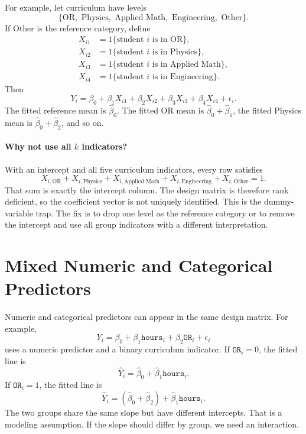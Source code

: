 {For example, let curriculum have levels
\begin{equation}
  \{\text{OR},\text{ Physics},\text{ Applied Math},\text{ Engineering},\text{ Other}\}.
\end{equation}
If Other is the reference category, define
\begin{align}
  X_{i1}&=1\{\text{student }i\text{ is in OR}\},\\
  X_{i2}&=1\{\text{student }i\text{ is in Physics}\},\\
  X_{i3}&=1\{\text{student }i\text{ is in Applied Math}\},\\
  X_{i4}&=1\{\text{student }i\text{ is in Engineering}\}.
\end{align}
Then
\begin{equation}
  Y_i=\beta_0+\beta_1X_{i1}+\beta_2X_{i2}+\beta_3X_{i3}+\beta_4X_{i4}+\epsilon_i.
\end{equation}
The fitted reference mean is \(\widehat{\beta}_0\).  The fitted OR mean is \(\widehat{\beta}_0+\widehat{\beta}_1\), the fitted Physics mean is \(\widehat{\beta}_0+\widehat{\beta}_2\), and so on.

\paragraph{Why not use all \(k\) indicators?}
With an intercept and all five curriculum indicators, every row satisfies
\begin{equation}
  X_{i,\text{OR}}+X_{i,\text{Physics}}+X_{i,\text{Applied Math}}+X_{i,\text{Engineering}}+X_{i,\text{Other}}=1.
\end{equation}
That sum is exactly the intercept column.  The design matrix is therefore rank deficient, so the coefficient vector is not uniquely identified.  This is the dummy-variable trap.  The fix is to drop one level as the reference category or to remove the intercept and use all group indicators with a different interpretation.

\section{Mixed Numeric and Categorical Predictors}

Numeric and categorical predictors can appear in the same design matrix.  For example,
\begin{equation}
  Y_i=\beta_0+\beta_1\texttt{hours}_i+\beta_2\texttt{OR}_i+\epsilon_i
\end{equation}
uses a numeric predictor and a binary curriculum indicator.  If \(\texttt{OR}_i=0\), the fitted line is
\begin{equation}
  \widehat{Y}_i=\widehat{\beta}_0+\widehat{\beta}_1\texttt{hours}_i.
\end{equation}
If \(\texttt{OR}_i=1\), the fitted line is
\begin{equation}
  \widehat{Y}_i=(\widehat{\beta}_0+\widehat{\beta}_2)+\widehat{\beta}_1\texttt{hours}_i.
\end{equation}
The two groups share the same slope but have different intercepts.  That is a modeling assumption.  If the slope should differ by group, we need an interaction.

}

